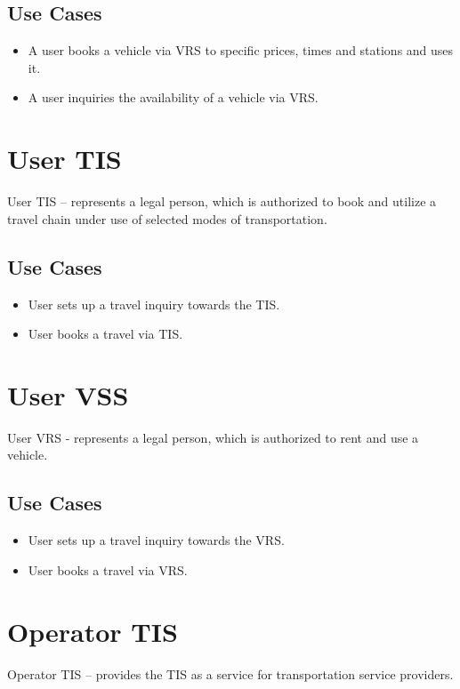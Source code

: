 \subsection*{Use Cases}
\begin{itemize}
\item A user books a vehicle via VRS to specific prices, times and stations and uses it.
\item A user inquiries the availability of a vehicle via VRS. 
\end{itemize}

\section*{User TIS}
User TIS – represents a legal person, which is authorized to book and utilize a travel chain under use of selected modes of transportation.

\subsection*{Use Cases}
\begin{itemize}
\item User sets up a travel inquiry towards the TIS.
\item User books a travel via TIS.
\end{itemize}

\section*{User VSS}
User VRS - represents a legal person, which is authorized to rent and use a vehicle.

\subsection*{Use Cases}
\begin{itemize}
\item User sets up a travel inquiry towards the VRS.
\item User books a travel via VRS.
\end{itemize}

\section*{Operator TIS}
Operator TIS – provides the TIS as a service for transportation service providers.



